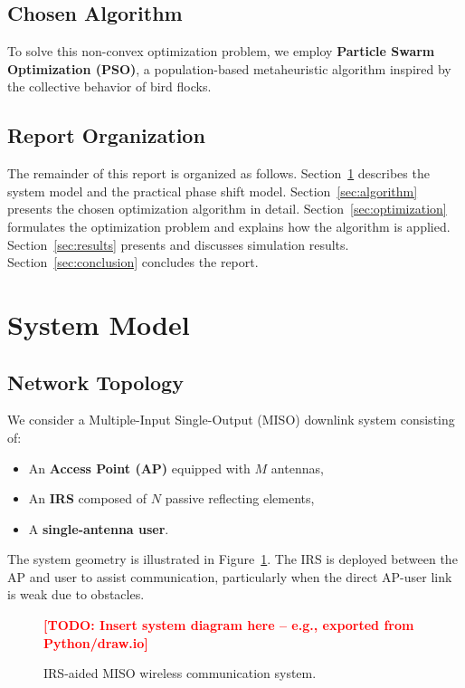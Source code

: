 \documentclass[12pt, a4paper]{article}
\newcommand{\TODO}[1]{\textcolor{red}{\textbf{[TODO: #1]}}}  %
\begin{document}
\subsection{Chosen Algorithm}
To solve this non-convex optimization problem, we employ
\textbf{Particle Swarm Optimization (PSO)}, a population-based metaheuristic
algorithm inspired by the collective behavior of bird flocks.

\subsection{Report Organization}
The remainder of this report is organized as follows.
Section~\ref{sec:sysmodel} describes the system model and the practical phase
shift model. Section~\ref{sec:algorithm} presents the chosen optimization algorithm
in detail. Section~\ref{sec:optimization} formulates the optimization problem and
explains how the algorithm is applied. Section~\ref{sec:results} presents and
discusses simulation results. Section~\ref{sec:conclusion} concludes the report.

\section{System Model}
\label{sec:sysmodel}

\subsection{Network Topology}
We consider a Multiple-Input Single-Output (MISO) downlink system consisting of:
\begin{itemize}
    \item An \textbf{Access Point (AP)} equipped with $M$ antennas,
    \item An \textbf{IRS} composed of $N$ passive reflecting elements,
    \item A \textbf{single-antenna user}.
\end{itemize}

The system geometry is illustrated in Figure~\ref{fig:system_model}. The IRS is
deployed between the AP and user to assist communication, particularly when the
direct AP-user link is weak due to obstacles.

\begin{figure}[H]
    \centering
    \TODO{Insert system diagram here -- e.g., exported from Python/draw.io}
    \caption{IRS-aided MISO wireless communication system.}
    \label{fig:system_model}
\end{figure}
\end{document}
